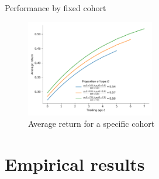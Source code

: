 \documentclass{beamer}
\begin{document}
\begin{frame}{Performance by fixed cohort}
\begin{figure}[h!]
	\centering
	\includegraphics[width= 0.5\textwidth]{figures/CohortReturn}
	\caption{Average return for a specific cohort}
	\label{fig:CohortReturn}
\end{figure}
\end{frame}


%
%
%


\section{Empirical results}
\end{document}
